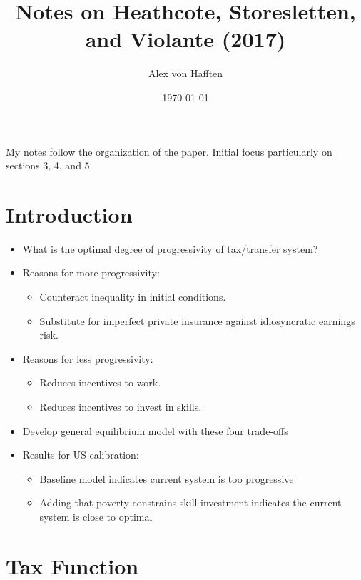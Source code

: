 \documentclass{article}
\title{Notes on Heathcote, Storesletten, and Violante (2017)}
\author{Alex von Hafften}
\date{\today}
\begin{document}
\maketitle

My notes follow the organization of the paper. Initial focus particularly on sections 3, 4, and 5.



\section{Introduction}



\begin{itemize}
\item What is the optimal degree of progressivity of tax/transfer system?
\item Reasons for more progressivity:
\begin{itemize}
\item Counteract inequality in initial conditions.
\item Substitute for imperfect private insurance against idiosyncratic earnings risk.
\end{itemize}
\item Reasons for less progressivity:
\begin{itemize}
\item Reduces incentives to work.
\item Reduces incentives to invest in skills.
\end{itemize}
\item Develop general equilibrium model with these four trade-offs
\item Results for US calibration:
\begin{itemize}
\item Baseline model indicates current system is too progressive
\item Adding that poverty constrains skill investment indicates the current system is close to optimal
\end{itemize}
\end{itemize}



\section{Tax Function}
\end{document}
